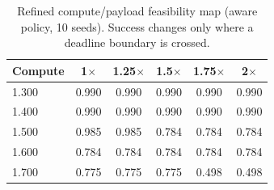 \begin{table}[t]
\centering
\footnotesize
\caption{Refined compute/payload feasibility map (aware policy, 10 seeds). Success changes only where a deadline boundary is crossed.}
\label{tab:p2-cp-fine}
\begin{tabular}{lccccc}
\toprule
Compute & 1$\times$ & 1.25$\times$ & 1.5$\times$ & 1.75$\times$ & 2$\times$ \\
\midrule
1.300 & 0.990 & 0.990 & 0.990 & 0.990 & 0.990 \\
1.400 & 0.990 & 0.990 & 0.990 & 0.990 & 0.990 \\
1.500 & 0.985 & 0.985 & 0.784 & 0.784 & 0.784 \\
1.600 & 0.784 & 0.784 & 0.784 & 0.784 & 0.784 \\
1.700 & 0.775 & 0.775 & 0.775 & 0.498 & 0.498 \\
\bottomrule
\end{tabular}
\par\vspace{2pt}{\footnotesize\raggedright Payload has no effect in most cells, but at 1.5x compute it moves success from 0.985 to 0.784 between p=1.25 and p=1.5; at 1.7x compute it drops from 0.775 to 0.498 between p=1.75 and p=2.0. This is a boundary-crossing interaction, not evidence that bytes are irrelevant in general.\par}
\end{table}
